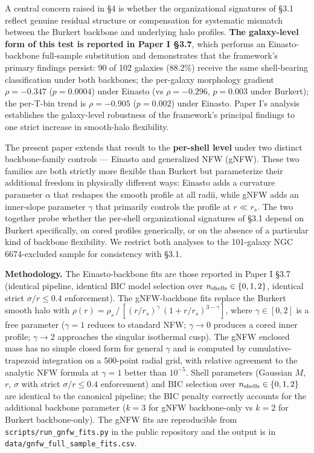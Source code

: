 \documentclass[linenumbers,trackchanges]{aastex701}
\begin{document}
A central concern raised in \S4 is whether the organizational signatures of \S3.1 reflect genuine residual structure or compensation for systematic mismatch between the Burkert backbone and underlying halo profiles. \textbf{The galaxy-level form of this test is reported in Paper I \S3.7}, which performs an Einasto-backbone full-sample substitution and demonstrates that the framework's primary findings persist: 90 of 102 galaxies (88.2\%) receive the same shell-bearing classification under both backbones; the per-galaxy morphology gradient $\rho = -0.347$ ($p = 0.0004$) under Einasto (vs $\rho = -0.296$, $p = 0.003$ under Burkert); the per-T-bin trend is $\rho = -0.905$ ($p = 0.002$) under Einasto. Paper I's analysis establishes the galaxy-level robustness of the framework's principal findings to one strict increase in smooth-halo flexibility.

The present paper extends that result to the \textbf{per-shell level} under two distinct backbone-family controls --- Einasto and generalized NFW (gNFW). These two families are both strictly more flexible than Burkert but parameterize their additional freedom in physically different ways: Einasto adds a curvature parameter $\alpha$ that reshapes the smooth profile at all radii, while gNFW adds an inner-slope parameter $\gamma$ that primarily controls the profile at $r \ll r_s$. The two together probe whether the per-shell organizational signatures of \S3.1 depend on Burkert specifically, on cored profiles generically, or on the absence of a particular kind of backbone flexibility. We restrict both analyses to the 101-galaxy NGC 6674-excluded sample for consistency with \S3.1.

\textbf{Methodology.} The Einasto-backbone fits are those reported in Paper I \S3.7 (identical pipeline, identical BIC model selection over $n_{\rm shells} \in \{0, 1, 2\}$, identical strict $\sigma/r \le 0.4$ enforcement). The gNFW-backbone fits replace the Burkert smooth halo with $\rho(r) = \rho_s\, /\, [(r/r_s)^\gamma\,(1 + r/r_s)^{3-\gamma}]$, where $\gamma \in [0, 2]$ is a free parameter ($\gamma = 1$ reduces to standard NFW; $\gamma \to 0$ produces a cored inner profile; $\gamma \to 2$ approaches the singular isothermal cusp). The gNFW enclosed mass has no simple closed form for general $\gamma$ and is computed by cumulative-trapezoid integration on a 500-point radial grid, with relative agreement to the analytic NFW formula at $\gamma = 1$ better than $10^{-5}$. Shell parameters (Gaussian $M$, $r$, $\sigma$ with strict $\sigma/r \le 0.4$ enforcement) and BIC selection over $n_{\rm shells} \in \{0, 1, 2\}$ are identical to the canonical pipeline; the BIC penalty correctly accounts for the additional backbone parameter ($k = 3$ for gNFW backbone-only vs $k = 2$ for Burkert backbone-only). The gNFW fits are reproducible from \texttt{scripts/run\_gnfw\_fits.py} in the public repository and the output is in \texttt{data/gnfw\_full\_sample\_fits.csv}.
\end{document}
